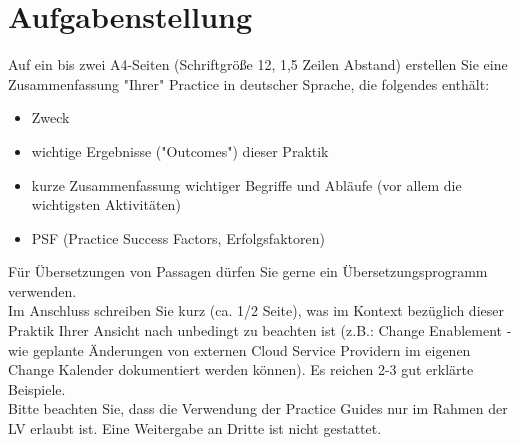\section{Aufgabenstellung}
Auf ein bis zwei A4-Seiten (Schriftgröße 12, 1,5 Zeilen Abstand) erstellen Sie eine Zusammenfassung "Ihrer" Practice in deutscher Sprache, die folgendes enthält: 

\begin{itemize}
	\item Zweck
	\item wichtige Ergebnisse ("Outcomes") dieser Praktik 
	\item kurze Zusammenfassung wichtiger Begriffe und Abläufe (vor allem die wichtigsten Aktivitäten)
	\item PSF (Practice Success Factors, Erfolgsfaktoren)
\end{itemize}

\noindent
Für Übersetzungen von Passagen dürfen Sie gerne ein Übersetzungsprogramm verwenden. \\

\noindent
Im Anschluss schreiben Sie kurz (ca. 1/2 Seite), was im Kontext bezüglich dieser Praktik Ihrer Ansicht nach unbedingt zu beachten ist (z.B.: Change Enablement - wie geplante Änderungen von externen Cloud Service Providern im eigenen Change Kalender dokumentiert werden können). Es reichen 2-3 gut erklärte Beispiele. \\

\noindent
Bitte beachten Sie, dass die Verwendung der Practice Guides nur im Rahmen der LV erlaubt ist. Eine Weitergabe an Dritte ist nicht gestattet. 

\clearpage